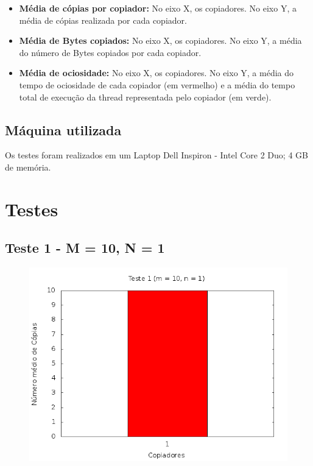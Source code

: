 \documentclass[12pt,a4paper]{article}
\begin{document}
\begin{itemize}
	\item \textbf{Média de cópias por copiador:} No eixo X, os copiadores. No eixo Y, a média de cópias realizada por cada copiador.
	\item \textbf{Média de Bytes copiados:} No eixo X, os copiadores. No eixo Y, a média do número de Bytes copiados por cada copiador.
	\item \textbf{Média de ociosidade:} No eixo X, os copiadores. No eixo Y, a média do tempo de ociosidade de cada copiador (em vermelho) e a média do tempo total de
	execução da thread representada pelo copiador (em verde).
\end{itemize}

\subsection{Máquina utilizada}
Os testes foram realizados em um Laptop Dell Inspiron - Intel Core 2 Duo; 4 GB de memória.

\pagebreak
\section{Testes}
\subsection{Teste 1 - M = 10, N = 1}
\begin{center}
\begin{figure}[H]
    \center
    \includegraphics[scale=0.5]{imagens/grafico_copias1.png}
    \label{teste1_copias}
\end{figure}
\end{center}
\end{document}
